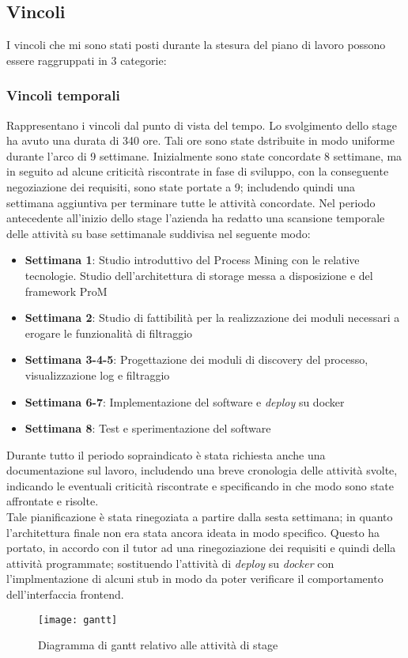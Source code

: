 \subsection{Vincoli}
I vincoli che mi sono stati posti durante la stesura del piano di lavoro possono essere raggruppati in 3 categorie:
\subsubsection{Vincoli temporali}
Rappresentano i vincoli dal punto di vista del tempo. Lo svolgimento dello stage ha avuto una durata di 340 ore. Tali ore sono state dstribuite in modo uniforme durante l'arco di 9 settimane. Inizialmente sono state concordate 8 settimane, ma in seguito ad alcune criticità riscontrate in fase di sviluppo, con la conseguente negoziazione dei requisiti, sono state portate a 9; includendo quindi una settimana aggiuntiva per terminare tutte le attività concordate.
Nel periodo antecedente all'inizio dello stage l'azienda ha redatto una scansione temporale delle attività su base settimanale suddivisa nel seguente modo:
\begin{itemize}
	\item \textbf{Settimana 1}: Studio introduttivo del Process Mining con le relative tecnologie. Studio dell’architettura di storage messa a disposizione e del	framework ProM
	\item \textbf{Settimana 2}: Studio di fattibilità per la realizzazione dei moduli necessari a erogare le funzionalità di filtraggio
    \item \textbf{Settimana 3-4-5}: Progettazione dei moduli di discovery del processo, visualizzazione log e filtraggio
    \item \textbf{Settimana 6-7}: Implementazione del software e \textit{\gls{deploy}} su docker
    \item \textbf{Settimana 8}: Test e sperimentazione del software
\end{itemize}
Durante tutto il periodo sopraindicato è stata richiesta anche una documentazione sul lavoro, includendo una breve cronologia delle attività svolte, indicando le eventuali criticità riscontrate e specificando in che modo sono state affrontate e risolte.\\
Tale pianificazione è stata rinegoziata a partire dalla sesta settimana; in quanto l'architettura finale non era stata ancora ideata in modo specifico. Questo ha portato, in accordo con il tutor ad una rinegoziazione dei requisiti e quindi della attività programmate; sostituendo l'attività di \textit{deploy} su \textit{docker} con l'implmentazione di alcuni stub in modo da poter verificare il comportamento dell'interfaccia frontend.
\begin{figure}[!h] 
	\centering 
	\texttt{[image: gantt]} 
	\caption{Diagramma di gantt relativo alle attività di stage}
\end{figure}
